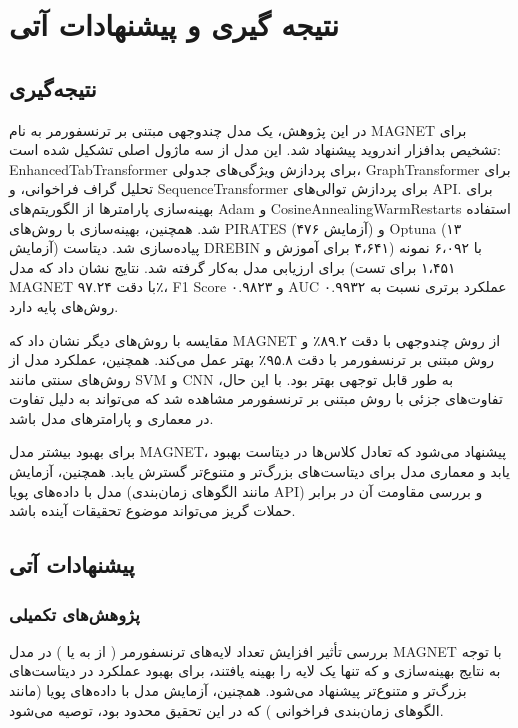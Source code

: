\clearpage
\thispagestyle{empty}
\chapter{نتیجه گیری و پیشنهادات آتی}\label{chap5}

\section{نتیجه‌گیری}
در این پژوهش، یک مدل چندوجهی مبتنی بر ترنسفورمر به نام MAGNET برای تشخیص بدافزار اندروید پیشنهاد شد. این مدل از سه ماژول اصلی تشکیل شده است: EnhancedTabTransformer برای پردازش ویژگی‌های جدولی، GraphTransformer برای تحلیل گراف فراخوانی، و SequenceTransformer برای پردازش توالی‌های API. برای بهینه‌سازی پارامترها از الگوریتم‌های Adam و CosineAnnealingWarmRestarts استفاده شد. همچنین، بهینه‌سازی با روش‌های PIRATES (۴۷۶ آزمایش) و Optuna (۱۳ آزمایش) پیاده‌سازی شد. دیتاست DREBIN \cite{Drebin} با ۶،۰۹۲ نمونه (۴،۶۴۱ برای آموزش و ۱،۴۵۱ برای تست) برای ارزیابی مدل به‌کار گرفته شد. نتایج نشان داد که مدل MAGNET با دقت ۹۷.۲۴٪، F1 Score ۰.۹۸۲۳ و AUC ۰.۹۹۳۲ عملکرد برتری نسبت به روش‌های پایه دارد.

مقایسه با روش‌های دیگر نشان داد که MAGNET از روش چندوجهی \cite{Alsaleh2023} با دقت ۸۹.۲٪ و روش مبتنی بر ترنسفورمر \cite{TransformerMalware} با دقت ۹۵.۸٪ بهتر عمل می‌کند. همچنین، عملکرد مدل از روش‌های سنتی مانند SVM \cite{ZhangNix2017} و CNN \cite{Vinayakumar2019} به طور قابل توجهی بهتر بود. با این حال، تفاوت‌های جزئی با روش مبتنی بر ترنسفورمر مشاهده شد که می‌تواند به دلیل تفاوت در معماری و پارامترهای مدل باشد.

برای بهبود بیشتر مدل MAGNET، پیشنهاد می‌شود که تعادل کلاس‌ها در دیتاست بهبود یابد و معماری مدل برای دیتاست‌های بزرگ‌تر و متنوع‌تر گسترش یابد. همچنین، آزمایش مدل با داده‌های پویا (مانند الگوهای زمان‌بندی API) و بررسی مقاومت آن در برابر حملات گریز می‌تواند موضوع تحقیقات آینده باشد.

\section{پیشنهادات آتی}
\subsection{پژوهش‌های تکمیلی}
بررسی تأثیر افزایش تعداد لایه‌های ترنسفورمر ( از  به  یا ) در مدل MAGNET با توجه به نتایج بهینه‌سازی  \cite{PIRATES} و  \cite{Optuna2019} که تنها یک لایه را بهینه یافتند، برای بهبود عملکرد در دیتاست‌های بزرگ‌تر و متنوع‌تر پیشنهاد می‌شود. همچنین، آزمایش مدل با داده‌های پویا (مانند الگوهای زمان‌بندی فراخوانی ) که در این تحقیق محدود بود، توصیه می‌شود.

